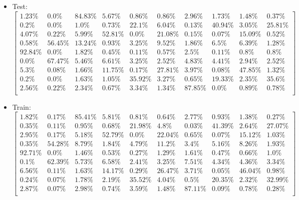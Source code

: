 \documentclass[a4paper,14pt]{report}
\begin{document}
	\begin{itemize}
		\item Test:
		$
		\begin{bmatrix}
		1.23\% & 0.0\% & 84.83\% & 5.67\% & 0.86\% & 0.86\% & 2.96\% & 1.73\% & 1.48\% & 0.37\% \\
		0.2\% & 0.0\% & 1.0\% & 0.73\% & 22.1\% & 6.04\% & 0.13\% & 40.94\% & 3.05\% & 25.81\% \\ 
		4.07\% & 0.22\% & 5.99\% & 52.81\% & 0.0\% & 21.08\% & 0.15\% & 0.07\% & 15.09\% & 0.52\% \\ 
		0.58\% & 56.45\% & 13.24\% & 0.93\% & 3.25\% & 9.52\% & 1.86\% & 6.5\% & 6.39\% & 1.28\% \\
		92.84\% & 0.0\% & 1.82\% & 0.45\% & 0.11\% & 0.57\% & 2.5\% & 0.11\% & 0.8\% & 0.8\% \\ 
		0.0\% & 67.47\% & 5.46\% & 6.61\% & 3.25\% & 2.52\% & 4.83\% & 4.41\% & 2.94\% & 2.52\% \\ 
		5.3\% & 0.08\% & 1.66\% & 11.75\% & 0.17\% & 27.81\% & 3.97\% & 0.08\% & 47.85\% & 1.32\% \\ 
		0.2\% & 0.0\% & 1.63\% & 1.05\% & 35.92\% & 3.27\% & 0.65\% & 19.33\% & 2.35\% & 35.6\% \\ 
		2.56\% & 0.22\% & 2.34\% & 0.67\% & 3.34\% & 1.34\% & 87.85\% & 0.0\% & 0.89\% & 0.78\% \\ 
		\end{bmatrix} 
		$
		\item Train:
		$
		\begin{bmatrix}
		1.82\% & 0.17\% & 85.41\% & 5.81\% & 0.81\% & 0.64\% & 2.77\% & 0.93\% & 1.38\% & 0.27\% \\ 
		0.35\% & 0.11\% & 0.95\% & 0.68\% & 21.98\% & 4.8\% & 0.03\% & 41.39\% & 2.64\% & 27.07\% \\ 
		2.95\% & 0.17\% & 5.18\% & 52.79\% & 0.0\% & 22.04\% & 0.65\% & 0.07\% & 15.12\% & 1.03\% \\ 
		0.35\% & 54.28\% & 8.79\% & 1.84\% & 4.79\% & 11.2\% & 3.4\% & 5.16\% & 8.26\% & 1.93\% \\ 
		92.71\% & 0.0\% & 1.46\% & 0.53\% & 0.27\% & 1.29\% & 1.61\% & 0.47\% & 0.66\% & 1.0\% \\ 
		0.1\% & 62.39\% & 5.73\% & 6.58\% & 2.41\% & 3.25\% & 7.51\% & 4.34\% & 4.36\% & 3.34\% \\ 
		6.56\% & 0.11\% & 1.63\% & 14.17\% & 0.29\% & 26.47\% & 3.71\% & 0.05\% & 46.04\% & 0.98\% \\ 
		0.24\% & 0.07\% & 1.78\% & 2.19\% & 35.52\% & 4.04\% & 0.5\% & 20.35\% & 2.32\% & 32.99\% \\ 
		2.87\% & 0.07\% & 2.98\% & 0.74\% & 3.59\% & 1.48\% & 87.11\% & 0.09\% & 0.78\% & 0.28\% \\
		\end{bmatrix} 
		$
	\end{itemize}
\end{document}
